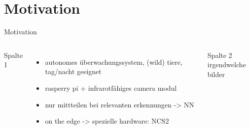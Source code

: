 \section*{Motivation}\label{sec:motivation}


\begin{frame}{Motivation}

    \begin{columns}[T]
        Spalte 1
        \begin{itemize}
            \item autonomes überwachungssystem, (wild) tiere, tag/nacht geeignet
            \item rasperry pi + infrarotfähiges camera modul
            \item nur mittteilen bei relevanten erkennungen -> NN
            \item on the edge -> spezielle hardware: NCS2
        \end{itemize}
        Spalte 2\\
        irgendwelche bilder
        
    \end{columns}
\end{frame}
